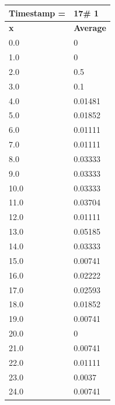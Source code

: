 \begin{tabular}{|l||l|}
\hline
\textbf{Timestamp =} & \textbf{17}\# 1\\\hline
	\textbf{x} & \textbf{Average} \\ \hline
\hline
	0.0 & 0 \\ \hline
	1.0 & 0 \\ \hline
	2.0 & 0.5 \\ \hline
	3.0 & 0.1 \\ \hline
	4.0 & 0.01481 \\ \hline
	5.0 & 0.01852 \\ \hline
	6.0 & 0.01111 \\ \hline
	7.0 & 0.01111 \\ \hline
	8.0 & 0.03333 \\ \hline
	9.0 & 0.03333 \\ \hline
	10.0 & 0.03333 \\ \hline
	11.0 & 0.03704 \\ \hline
	12.0 & 0.01111 \\ \hline
	13.0 & 0.05185 \\ \hline
	14.0 & 0.03333 \\ \hline
	15.0 & 0.00741 \\ \hline
	16.0 & 0.02222 \\ \hline
	17.0 & 0.02593 \\ \hline
	18.0 & 0.01852 \\ \hline
	19.0 & 0.00741 \\ \hline
	20.0 & 0 \\ \hline
	21.0 & 0.00741 \\ \hline
	22.0 & 0.01111 \\ \hline
	23.0 & 0.0037 \\ \hline
	24.0 & 0.00741 \\ \hline
\end{tabular}


